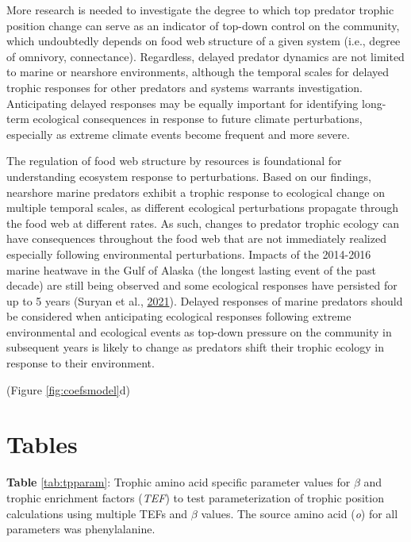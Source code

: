 \documentclass [11pt, proquest] {uwthesis}[2015/03/03]
\begin{document}
More research is needed to investigate the degree to which top predator
trophic position change can serve as an indicator of top-down control on
the community, which undoubtedly depends on food web structure of a
given system (i.e., degree of omnivory, connectance). Regardless,
delayed predator dynamics are not limited to marine or nearshore
environments, although the temporal scales for delayed trophic responses
for other predators and systems warrants investigation. Anticipating
delayed responses may be equally important for identifying long-term
ecological consequences in response to future climate perturbations,
especially as extreme climate events become frequent and more severe.

The regulation of food web structure by resources is foundational for
understanding ecosystem response to perturbations. Based on our
findings, nearshore marine predators exhibit a trophic response to
ecological change on multiple temporal scales, as different ecological
perturbations propagate through the food web at different rates. As
such, changes to predator trophic ecology can have consequences
throughout the food web that are not immediately realized especially
following environmental perturbations. Impacts of the 2014-2016 marine
heatwave in the Gulf of Alaska (the longest lasting event of the past
decade) are still being observed and some ecological responses have
persisted for up to 5 years (Suryan et al.,
\protect\hyperlink{ref-Suryan2021}{2021}). Delayed responses of marine
predators should be considered when anticipating ecological responses
following extreme environmental and ecological events as top-down
pressure on the community in subsequent years is likely to change as
predators shift their trophic ecology in response to their environment.

(Figure \ref{fig:coefsmodel}d) \clearpage

\section{Tables}\label{tables-2}

\textbf{Table} \ref{tab:tpparam}: Trophic amino acid specific parameter
values for \(\beta\) and trophic enrichment factors (\emph{TEF}) to test
parameterization of trophic position calculations using multiple TEFs
and \(\beta\) values. The source amino acid (\emph{o}) for all
parameters was phenylalanine.
\end{document}
